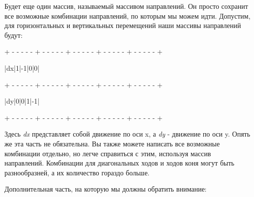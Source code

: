 Будет еще один массив, называемый массивом направлений. Он просто сохранит все возможные комбинации направлений, по которым мы можем идти. Допустим, для горизонтальных и вертикальных перемещений наши массивы направлений будут:

\begin{tcolorbox}
{\tiny{+ - - - - - + - - - - - + - - - - - + - - - - - + - - - - - +}}

\hspace{0.4mm}|\hspace{3mm}dx\hspace{3mm}|\hspace{4.2mm}1\hspace{4.2mm}|\hspace{3.6mm}-1\hspace{3.6mm}|\hspace{4.2mm}0\hspace{4.2mm}|\hspace{4.2mm}0\hspace{4.2mm}|

{\tiny{+ - - - - - + - - - - - + - - - - - + - - - - - + - - - - - +}}

\hspace{0.4mm}|\hspace{3mm}dy\hspace{3mm}|\hspace{4.2mm}0\hspace{4.2mm}|\hspace{4.2mm}0\hspace{4.2mm}|\hspace{4.2mm}1\hspace{4.2mm}|\hspace{3.6mm}-1\hspace{3.6mm}|

{\tiny{+ - - - - - + - - - - - + - - - - - + - - - - - + - - - - - +}}
\end{tcolorbox}

Здесь \textit{dx} представляет собой движение по оси x, а \textit{dy} - движение по оси y. Опять же эта часть не обязательна. Вы также можете написать все возможные комбинации отдельно, но легче справиться с этим, используя массив направлений. Комбинации для диагональных ходов и ходов коня могут быть разнообразней, а их количество гораздо больше.

\vspace{\baselineskip}

Дополнительная часть, на которую мы должны обратить внимание:

